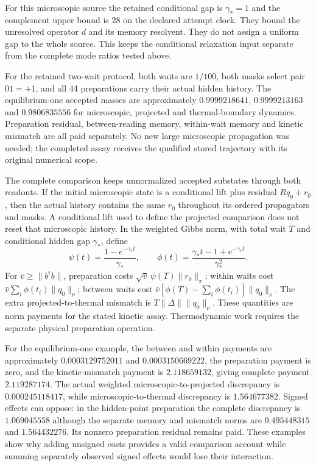 For this microscopic source the retained conditional gap is $\gamma_*=1$ and the complement upper bound is $28$ on the declared attempt clock. They bound the unresolved operator $d$ and its memory resolvent. They do not assign a uniform gap to the whole source. This keeps the conditional relaxation input separate from the complete mode ratios tested above.

For the retained two-wait protocol, both waits are $1/100$, both masks select pair $01=+1$, and all 44 preparations carry their actual hidden history. The equilibrium-one accepted masses are approximately $0.9999218641$, $0.9999213163$ and $0.9806835556$ for microscopic, projected and thermal-boundary dynamics. Preparation residual, between-reading memory, within-wait memory and kinetic mismatch are all paid separately. No new large microscopic propagation was needed; the completed assay receives the qualified stored trajectory with its original numerical scope.

The complete comparison keeps unnormalized accepted substates through both readouts. If the initial microscopic state is a conditional lift plus residual $Rq_0+r_0$, then the actual history contains the same $r_0$ throughout its ordered propagators and masks. A conditional lift used to define the projected comparison does not reset that microscopic history. In the weighted Gibbs norm, with total wait $T$ and conditional hidden gap $\gamma_*$, define
\begin{equation}
 \psi(t)=\frac{1-e^{-\gamma_*t}}{\gamma_*},\qquad
 \phi(t)=\frac{\gamma_*t-1+e^{-\gamma_*t}}{\gamma_*^2}.
\end{equation}
For $\bar v\geq\|b^tb\|$, preparation costs
$\sqrt{\bar v}\,\psi(T)\|r_0\|_\pi$; within waits cost
$\bar v\sum_i\phi(t_i)\|q_0\|_\nu$; between waits cost
$\bar v[\phi(T)-\sum_i\phi(t_i)]\|q_0\|_\nu$. The extra projected-to-thermal mismatch is $T\|\Delta\|\|q_0\|_\nu$. These quantities are norm payments for the stated kinetic assay. Thermodynamic work requires the separate physical preparation operation.

For the equilibrium-one example, the between and within payments are approximately $0.0003129752011$ and $0.0003150669222$, the preparation payment is zero, and the kinetic-mismatch payment is $2.118659132$, giving complete payment $2.119287174$. The actual weighted microscopic-to-projected discrepancy is $0.000245118417$, while microscopic-to-thermal discrepancy is $1.564677382$. Signed effects can oppose: in the hidden-point preparation the complete discrepancy is $1.069045558$ although the separate memory and mismatch norms are $0.495448315$ and $1.564432276$. Its nonzero preparation residual remains paid. These examples show why adding unsigned costs provides a valid comparison account while summing separately observed signed effects would lose their interaction.

